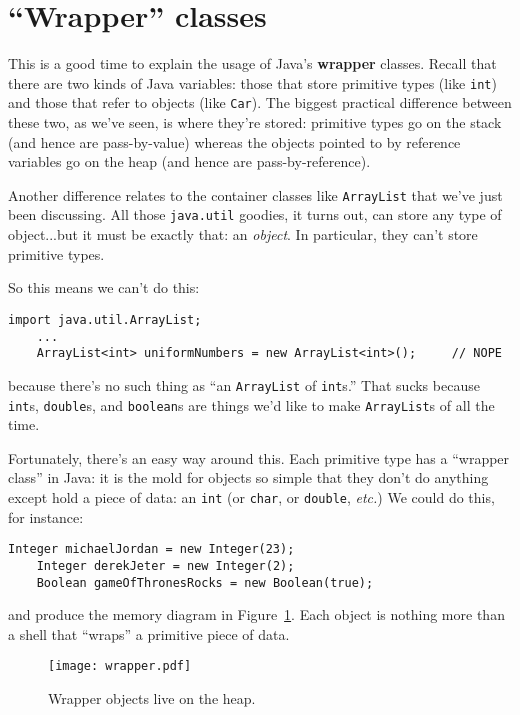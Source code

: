 \section{``Wrapper'' classes}

This is a good time to explain the usage of Java's \textbf{wrapper} classes.
Recall that there are two kinds of Java variables: those that store primitive
types (like \texttt{int}) and those that refer to objects (like \texttt{Car}).
The biggest practical difference between these two, as we've seen, is where
they're stored: primitive types go on the stack (and hence are pass-by-value)
whereas the objects pointed to by reference variables go on the heap (and
hence are pass-by-reference).

Another difference relates to the container classes like \texttt{ArrayList}
that we've just been discussing. All those \texttt{java.util} goodies, it
turns out, can store any type of object...but it must be exactly that: an
\textit{object}. In particular, they can't store primitive types.

So this means we can't do this:

\begin{Verbatim}[fontsize=\small,samepage=true]
    import java.util.ArrayList;
    ...
    ArrayList<int> uniformNumbers = new ArrayList<int>();     // NOPE
\end{Verbatim}

because there's no such thing as ``an \texttt{ArrayList} of \texttt{int}s.''
That sucks because \texttt{int}s, \texttt{double}s, and \texttt{boolean}s are
things we'd like to make \texttt{ArrayList}s of all the time.

Fortunately, there's an easy way around this. Each primitive type has a
``wrapper class'' in Java: it is the mold for objects so simple that they don't
do anything except hold a piece of data: an \texttt{int} (or \texttt{char}, or
\texttt{double}, \textit{etc.}) We could do this, for instance:

\begin{Verbatim}[fontsize=\small,samepage=true]
    Integer michaelJordan = new Integer(23);
    Integer derekJeter = new Integer(2);
    Boolean gameOfThronesRocks = new Boolean(true);
\end{Verbatim}

and produce the memory diagram in Figure~\ref{fig:wrapper}. Each object is
nothing more than a shell that ``wraps'' a primitive piece of data.

\begin{figure}[ht]
\centering
\texttt{[image: wrapper.pdf]}  %
\caption{Wrapper objects live on the heap.}
\label{fig:wrapper}
\end{figure}

